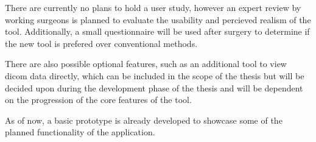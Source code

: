 There are currently no plans to hold a user study, however an expert review by working surgeons is planned to evaluate the usability and percieved realism of the tool.
Additionally, a small questionnaire will be used after surgery to determine if the new tool is prefered over conventional methods.

There are also possible optional features, such as an additional tool to view dicom data directly, which can be included in the scope of the thesis but will be decided upon during the development phase of the thesis and will be dependent on the progression of the core features of the tool.

As of now, a basic prototype is already developed to showcase some of the planned functionality of the application.




